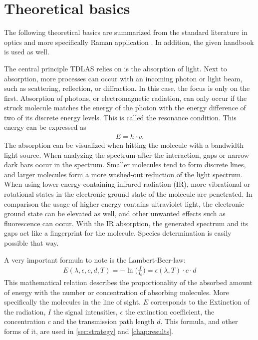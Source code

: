 
\chapter{Theoretical basics}
\label{chap:theoretical}

The following theoretical basics are summarized from the standard literature in optics \autocite{bornPrinciplesOpticsElectromagnetic1999,hechtOptik2005,lipsonOptik1997,niedrigOptikWellenUnd2004} and more specifically Raman application \autocite{herzbergMolecularSpectraMolecular2013,schraderInfraredRamanSpectroscopy1995}. In addition, the given handbook \autocite{klevanskyTDLASTunableLaser2021} is used as well.

The central principle TDLAS relies on is the absorption of light. Next to absorption, more processes can occur with an incoming photon or light beam, such as scattering, reflection, or diffraction. In this case, the focus is only on the first. Absorption of photons, or electromagnetic radiation, can only occur if the struck molecule matches the energy of the photon with the energy difference of two of its discrete energy levels. This is called the resonance condition. This energy can be expressed as
\begin{align}
    E=h \cdot v \nonumber .
\end{align}
The absorption can be visualized when hitting the molecule with a bandwidth light source. When analyzing the spectrum after the interaction, gaps or narrow dark bars occur in the spectrum. Smaller molecules tend to form discrete lines, and larger molecules form a more washed-out reduction of the light spectrum. When using lower energy-containing infrared radiation (IR), more vibrational or rotational states in the electronic ground state of the molecule are penetrated. In comparison the usage of higher energy contains ultraviolet light, the electronic ground state can be elevated as well, and other unwanted effects such as fluorescence can occur. With the IR absorption, the generated spectrum and its gaps act like a fingerprint for the molecule. Species determination is easily possible that way.

A very important formula to note is the Lambert-Beer-law:
\begin{align}
    E(\lambda, \epsilon, c, d, T)=-\ln\Big(\frac{I}{I_\mathrm{0}}\Big)=\epsilon(\lambda, T) \cdot c \cdot d \nonumber
\end{align}
This mathematical relation describes the proportionality of the absorbed amount of energy with the number or concentration of absorbing molecules. More specifically the molecules in the line of sight. $E$ corresponds to the Extinction of the radiation, $I$ the signal intensities, $\epsilon$ the extinction coefficient, the concentration $c$ and the transmission path length $d$. This formula, and other forms of it, are used in \autoref{sec:strategy} and \autoref{chap:results}.

